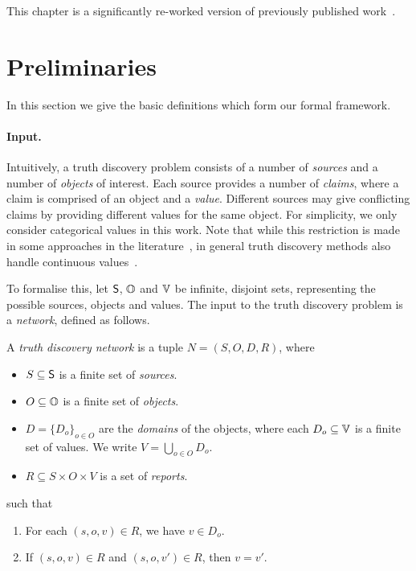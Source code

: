 This chapter is a significantly re-worked version of previously published
work~\cite{singleton_booth_2020,singleton2022towards}.

\section{Preliminaries}
\label{td_new_sec_preliminaries}

In this section we give the basic definitions which form our formal framework.

\paragraph{Input.}

Intuitively, a truth discovery problem consists of a number of \emph{sources}
and a number of \emph{objects} of interest. Each source provides a number of
\emph{claims}, where a claim is comprised of an object and a \emph{value}.
Different sources may give conflicting claims by providing different values for
the same object. For simplicity, we only consider categorical values in this
work. Note that while this restriction is made in some approaches in the
literature~\cite{pasternack2010,yin2008,wang_truth_2012,dong_truth_2009,zhang2018},
in general truth discovery methods also handle continuous
values~\cite{li2016,xiao2016}.

To formalise this, let $\S$, $\O$ and $\V$ be infinite, disjoint sets,
representing the possible sources, objects and values. The input to the truth
discovery problem is a \emph{network}, defined as follows.

\begin{definition}
    \label{td_new_def_network}
    A \emph{truth discovery network} is a tuple $N = (S, O, D, R)$, where
    \begin{itemize}
        \item $S \subseteq \S$ is a finite set of \emph{sources}.
        \item $O \subseteq \O$ is a finite set of \emph{objects}.
        \item $D = \{D_o\}_{o \in O}$ are the \emph{domains} of the objects,
              where each $D_o \subseteq \V$ is a finite set of values. We write
              $V = \bigcup_{o \in O}{D_o}$.
        \item $R \subseteq S \times O \times V$ is a set of \emph{reports}.
    \end{itemize}
    such that
    \begin{enumerate}
        \item\label{td_new_item_val_in_domain}
            For each $(s, o, v) \in R$, we have $v \in D_o$.
        \item\label{td_new_item_sources_self_consistent}
            If $(s, o, v) \in R$ and $(s, o, v') \in R$, then $v = v'$.
    \end{enumerate}
\end{definition}

